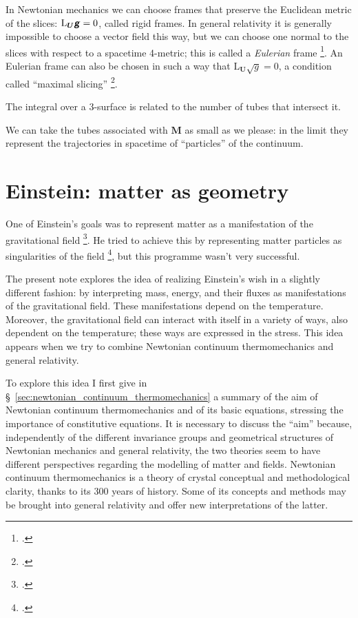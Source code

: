 \documentclass[\ifafour a4paper,12pt,\else a5paper,10pt,\fi%
onecolumn,oneside,article,%
british%
]{memoir}
\theoremstyle{remark}
\theoremstyle{innote}
\newcommand*{\mathte}[1]{\textbf{\textit{\textsf{#1}}}}
\newcommand*{\citep}{\footcites}%
\renewcommand*{\|}{\nonscript\,\vert\nonscript\;\mathopen{}}
\newcommand*{\sect}{\S}%
\newcommand*{\Li}{\mathrm{L}}
\newcommand*{\yrr}{M}
\newcommand*{\yr}{\bm{\yrr}}
\newcommand*{\yFF}{U}
\newcommand*{\yF}{\bm{\yFF}}
\newcommand*{\ygg}{g}
\newcommand*{\yg}{\mathte{\ygg}}
\newcommand*{\ygv}{\sqrt{\ygg}}
\begin{document}
\bigskip

In Newtonian mechanics we can choose frames that preserve the Euclidean
metric of the slices: $\Li_{\yF}\yg = 0$, called rigid frames. In general
relativity it is generally impossible to choose a vector field this way,
but we can choose one normal to the slices with respect to a spacetime
4-metric; this is called a \emph{Eulerian} frame
\citep{smarretal1978,smarretal1980}. An Eulerian frame can also be chosen in
such a way that $\Li_{\yF}\ygv=0$, a condition called \enquote{maximal
  slicing} \citep[\sect~III.B]{smarretal1978}.

The integral over a 3-surface is related
to the number of tubes that intersect it.

We can take the tubes associated with $\yr$ as small as we please: in the
limit they represent the trajectories in spacetime of \enquote{particles}
of the continuum.


\section{Einstein: matter as geometry}
\label{sec:einstein_matter_fields}

One of Einstein's goals was to represent matter as a manifestation of the
gravitational field \citep[see][]{havasetal1962,havas1967}. He tried to
achieve this by representing matter particles as singularities of the field
\citep{einsteinetal1938}, but this programme wasn't very successful.

The present note explores the idea of realizing Einstein's wish in a
slightly different fashion: by interpreting mass, energy, and their fluxes
as manifestations of the gravitational field. These manifestations depend
on the temperature. Moreover, the gravitational field can interact with
itself in a variety of ways, also dependent on the temperature; these ways
are expressed in the stress. This idea appears when we try to combine
Newtonian continuum thermomechanics and general relativity.

To explore this idea I first give in
\sect~\ref{sec:newtonian_continuum_thermomechanics} a summary of the aim of
Newtonian continuum thermomechanics and of its basic equations, stressing
the importance of constitutive equations. It is necessary to discuss the
\enquote{aim} because, independently of the different invariance groups and
geometrical structures of Newtonian mechanics and general relativity, the
two theories seem to have different perspectives regarding the modelling of
matter and fields. Newtonian continuum thermomechanics is a theory of
crystal conceptual and methodological clarity, thanks to its 300 years of
history. Some of its concepts and methods may be brought into general
relativity and offer new interpretations of the latter.
\end{document}
